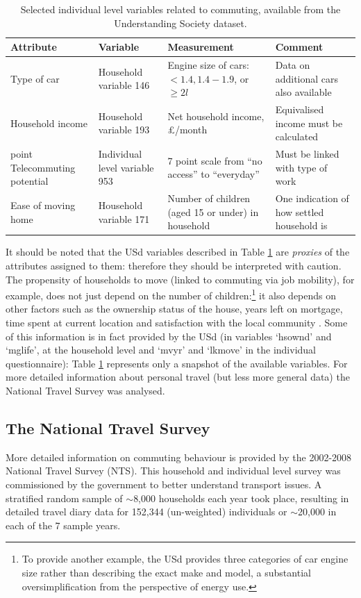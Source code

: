 \documentclass[a4paper, 11pt, twoside]{Thesis}
\begin{document}
\begin{table}[htbp]
\caption[Selected individual level variables related to commuting]{Selected
individual level variables related to commuting,
available from the Understanding Society dataset.}
\begin{tabular}{|p{2.5cm}|p{2.5cm}|p{4cm}|p{4cm}|}
\hline
Attribute & Variable & Measurement & Comment \\ \hline
Type of car & Household variable 146 & Engine size of cars: \hspace{1cm} $< 1.4
,
1.4-1.9 $, or $\ge 2 l$  & Data on additional cars also available \\
\hline
Household income & Household variable 193 & Net household income,
\pounds/month & Equivalised income must be calculated \\ \hline
point
Telecommuting potential & Individual level variable 953 & 7 point scale from “no
access”
to “everyday” & Must be linked with type of work \\ \hline
Ease of moving home & Household variable 171 & Number of children (aged 15 or
under) in household   & One indication of how settled household is \\ \hline
\end{tabular}
\label{t:indata}
\end{table}

It should be noted that the USd variables described in Table \ref{t:indata} are
\emph{proxies} of the attributes assigned to them: therefore they should be
interpreted with caution. The propensity of households to move (linked to
commuting via job mobility), for example, does not just depend on the number of
children:\footnote{To
provide another
example, the USd provides three categories of car engine size rather than
describing the exact make and model, a substantial oversimplification from the
perspective of energy use.
}
 it also depends on other factors such as the ownership status of the house,
years left on mortgage, time spent at current location and satisfaction with the
local community \citep{Charlotta2011}. Some of this information is in fact
provided by the USd (in variables `hsownd' and `mglife', at the household level
and `mvyr' and `lkmove' in the individual questionnaire): Table \ref{t:indata}
represents only a snapshot of the available variables. For more detailed
information about personal travel (but less more general data) the
National Travel Survey was analysed.

\subsection{The National Travel Survey} 
\label{snts}
More detailed information on commuting behaviour is provided by the 2002-2008
National Travel Survey (NTS). This household and individual level survey was
commissioned by the government to better understand transport issues. A
stratified random sample of $\sim$8,000 households each year took place,
resulting in detailed travel diary data for 152,344 (un-weighted) individuals
or $\sim$20,000 in each of the 7 sample years.
\end{document}
